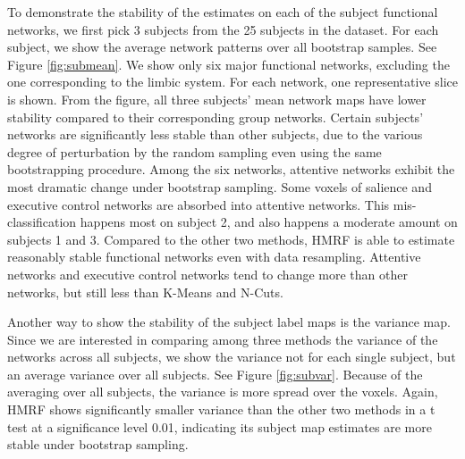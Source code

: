 \documentclass[review,authoryear]{elsarticle}
\begin{document}
To demonstrate the stability of the estimates on each of the subject functional
networks, we first pick 3 subjects from the 25 subjects in the dataset. For each
subject, we show the average network patterns over all bootstrap samples. See
Figure \ref{fig:submean}. We show only six major functional networks, excluding
the one corresponding to the limbic system. For each network, one representative
slice is shown. From the figure, all three subjects' mean network maps have
lower stability compared to their corresponding group networks. Certain
subjects' networks are significantly less stable than other subjects, due to the
various degree of perturbation by the random sampling even using the same
bootstrapping procedure. Among the six networks, attentive networks exhibit the
most dramatic change under bootstrap sampling. Some voxels of salience and
executive control networks are absorbed into attentive networks. This
mis-classification happens most on subject 2, and also happens a moderate amount
on subjects 1 and 3. Compared to the other two methods, HMRF is able to estimate
reasonably stable functional networks even with data resampling. Attentive
networks and executive control networks tend to change more than other networks,
but still less than K-Means and N-Cuts.

Another way to show the stability of the subject label maps is the variance
map. Since we are interested in comparing among three methods the variance of
the networks across all subjects, we show the variance not for each single
subject, but an average variance over all subjects. See Figure
\ref{fig:subvar}. Because of the averaging over all subjects, the variance is
more spread over the voxels. Again, HMRF shows significantly smaller variance
than the other two methods in a t test at a significance level 0.01, indicating
its subject map estimates are more stable under bootstrap sampling.

\end{document}
